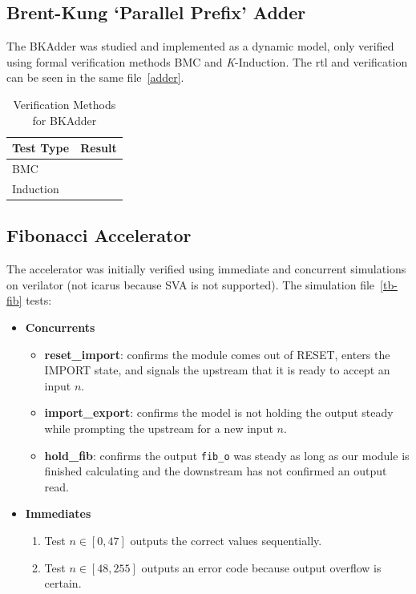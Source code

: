 \documentclass[a4paper]{report}
\begin{document}
			\subsection{Brent-Kung `Parallel Prefix' Adder}
				The BKAdder was studied and implemented as a dynamic model, only verified
				using formal verification methods BMC and \textit{K}-Induction. The
				rtl and verification can be seen in the same file~\ref{adder}. 

				\begin{table}[H]
					\centering
					\begin{tabular}{lc}
						\toprule
						\textbf{Test Type} & \textbf{Result} \\
						\midrule
							BMC & \checkmark\\
							\midrule
							Induction & \checkmark\\
						\bottomrule
					\end{tabular}
					\caption{Verification Methods for BKAdder}
				\end{table}

			\subsection{Fibonacci Accelerator}
				The accelerator was initially verified using immediate and concurrent
				simulations on verilator (not icarus because SVA is not supported). 
				The simulation file~\ref{tb-fib} tests:

				\begin{itemize}
					\item \textbf{Concurrents}
						\begin{itemize}
							\item \textbf{reset\_import}: confirms the module comes out
								of RESET, enters the IMPORT state, and signals the upstream
								that it is ready to accept an input $n$.

							\item \textbf{import\_export}: confirms the model is not 
								holding the output steady while prompting the upstream
								for a new input $n$.

							\item \textbf{hold\_fib}: confirms the output \texttt{fib\_o} was
								steady as long as our module is finished calculating and the downstream
								has not confirmed an output read.
						\end{itemize}

					\item \textbf{Immediates}
						\begin{enumerate}
							\item Test $n \in [0,47]$ outputs the correct values sequentially.
							\item Test $n \in [48,255]$ outputs an error code because output overflow is certain.
						\end{enumerate}
				\end{itemize}
\end{document}
